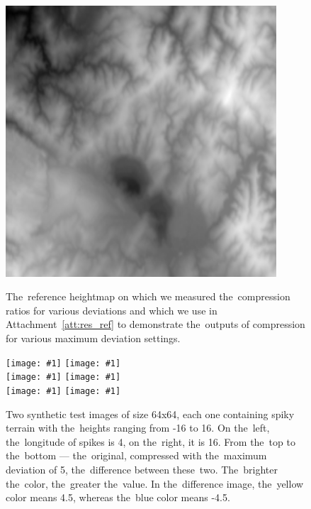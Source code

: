 \begin{figure}
	\begin{center}
	\includegraphics[width=0.9\textwidth]{figures/out_0.png} \\ 
	\end{center}
	\caption{The~reference heightmap on which we measured the~compression ratios for various deviations and which we use in Attachment~\ref{att:res_ref} to demonstrate the~outputs of compression for various maximum deviation settings.}
	\label{fig:ref_map}
\end{figure}

\newcommand{\incexamplpair}[1]{\texttt{[image: \#1]}}

\begin{figure}
	\begin{center}
	\incexamplpair{figures/dim_64_amp_16_lon_4_horizontal_orig.png} 
	\incexamplpair{figures/dim_64_amp_16_lon_16_horizontal_orig.png} \\ 
	\incexamplpair{figures/dim_64_amp_16_lon_4_horizontal_out.png} 
	\incexamplpair{figures/dim_64_amp_16_lon_16_horizontal_out.png} \\ 
	\incexamplpair{figures/dim_64_amp_16_lon_4_horizontal_diff.png} 
	\incexamplpair{figures/dim_64_amp_16_lon_16_horizontal_diff.png}
    \end{center}
	\caption{Two synthetic test images of size 64x64, each one containing spiky terrain with the~heights ranging from -16 to 16. On the~left, the~longitude of spikes is 4, on the~right, it is 16. From the~top to the~bottom --- the~original, compressed with the~maximum deviation of 5, the~difference between these~two. The~brighter the~color, the~greater the~value. In the~difference image, the~yellow color means 4.5, whereas the~blue color means -4.5.}
	\label{fig:result_wave_samples}
\end{figure}

